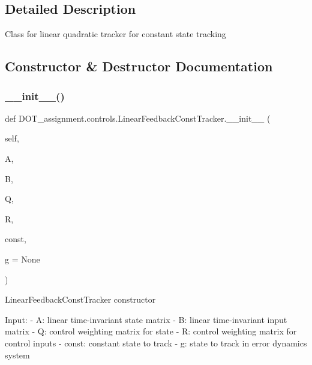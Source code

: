 \subsection{Detailed Description}
\begin{DoxyVerb}Class for linear quadratic tracker for constant state tracking
\end{DoxyVerb}
 

\subsection{Constructor \& Destructor Documentation}
\mbox{\label{class_d_o_t__assignment_1_1controls_1_1_linear_feedback_const_tracker_a5673a5219e7675de2bf80ea945aa33f1}} 
\subsubsection{\texorpdfstring{\_\_init\_\_()}{\_\_init\_\_()}}
{\footnotesize\ttfamily def D\+O\+T\+\_\+assignment.\+controls.\+Linear\+Feedback\+Const\+Tracker.\+\_\+\+\_\+init\+\_\+\+\_\+ (\begin{DoxyParamCaption}\item[{}]{self,  }\item[{}]{A,  }\item[{}]{B,  }\item[{}]{Q,  }\item[{}]{R,  }\item[{}]{const,  }\item[{}]{g = {\ttfamily None} }\end{DoxyParamCaption})}

\begin{DoxyVerb}LinearFeedbackConstTracker constructor

Input:
- A:            linear time-invariant state matrix
- B:            linear time-invariant input matrix
- Q:            control weighting matrix for state
- R:            control weighting matrix for control inputs
- const:        constant state to track
- g:            state to track in error dynamics system\end{DoxyVerb}
 

